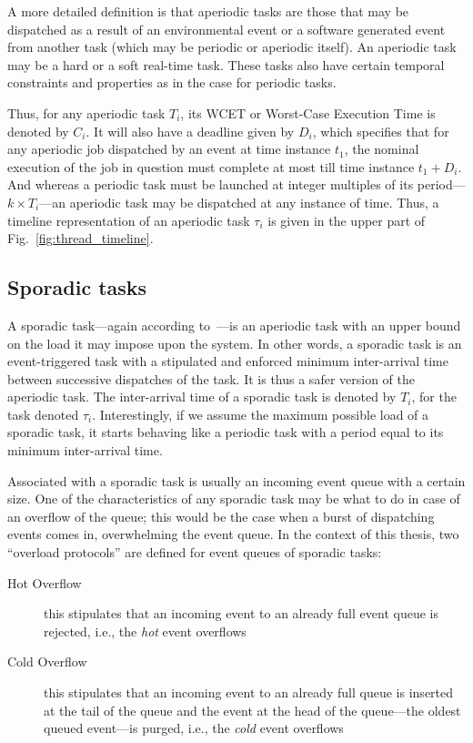A more detailed definition is that aperiodic tasks are those that
may be dispatched as a result of an environmental event or a software
generated event from another task (which may be periodic or
aperiodic itself). An aperiodic task may be a hard or a soft
real-time task. These tasks also have certain temporal constraints
and properties as in the case for periodic tasks.

Thus, for any aperiodic task $T_i$, its WCET or Worst-Case Execution
Time is denoted by $C_i$. It will also have a deadline given by $D_i$,
which specifies that for any aperiodic job dispatched by an event at
time instance $t_1$, the nominal execution of the job in question must
complete at most till time instance $t_1 + D_i$. And whereas a
periodic task must be launched at integer multiples of its
period---$k\times T_i$---an aperiodic task may be dispatched at any
instance of time. Thus, a timeline representation of an aperiodic task
$\tau_i$ is given in the upper part of Fig.~\ref{fig:thread_timeline}.

\subsection{Sporadic tasks}
A sporadic task---again according to~\cite{sha@rts04}---is an
aperiodic task with an upper bound on the load it may impose upon the
system. In other words, a sporadic task is an event-triggered task
with a stipulated and enforced minimum inter-arrival time between
successive dispatches of the task. It is thus a safer version of the
aperiodic task. The inter-arrival time of a sporadic task is denoted
by $T_i$, for the task denoted $\tau_i$. Interestingly, if we assume
the maximum possible load of a sporadic task, it starts behaving like
a periodic task with a period equal to its minimum inter-arrival time.

Associated with a sporadic task is usually an incoming event queue
with a certain size. One of the characteristics of any sporadic task
may be what to do in case of an overflow of the queue; this would be
the case when a burst of dispatching events comes in, overwhelming the
event queue. In the context of this thesis, two ``overload protocols''
are defined for event queues of sporadic tasks:

\begin{description}
\item[Hot Overflow]{this stipulates that an incoming event to an
  already full event queue is rejected, i.e., the \emph{hot} event
  overflows}
\item[Cold Overflow]{this stipulates that an incoming event to an
  already full queue is inserted at the tail of the queue and the
  event at the head of the queue---the oldest queued event---is
  purged, i.e., the \emph{cold} event overflows}
\end{description}


